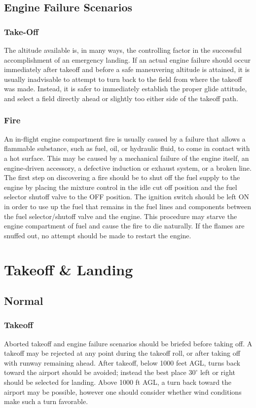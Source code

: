 \documentclass[12pt]{article}
\begin{document}
	\subsection{Engine Failure Scenarios}
		\subsubsection{Take-Off}
			The altitude available is, in many ways, the controlling factor in the successful accomplishment of an emergency landing. If an actual engine failure should occur immediately after takeoff and before a safe maneuvering altitude is attained, it is usually inadvisable to attempt to turn back to the field from where the takeoff was made. Instead, it is safer to immediately establish the proper glide attitude, and select a field directly ahead or slightly too either side of the takeoff path.
		\subsubsection{Fire}
			An in-flight engine compartment fire is usually caused by a failure that allows a flammable substance, such as fuel, oil, or hydraulic fluid, to come in contact with a hot surface. This may be caused by a mechanical failure of the engine itself, an engine-driven accessory, a defective induction or exhaust system, or a broken line. The first step on discovering a fire should be to shut off the fuel supply to the engine by placing the mixture control in the idle cut off position and the fuel selector shutoff valve to the OFF position. The ignition switch should be left ON in order to use up the fuel that remains in the fuel lines and components between the fuel selector/shutoff valve and the engine. This procedure may starve the engine compartment of fuel and cause the fire to die naturally. If the flames are snuffed out, no attempt should be made to restart the engine.
\newpage
\section{Takeoff \& Landing}
	\subsection{Normal}
		\subsubsection{Takeoff}
			Aborted takeoff and engine failure scenarios should be briefed before taking off. A takeoff may be rejected at any point during the takeoff roll, or after taking off with runway remaining ahead. After takeoff, below 1000 feet AGL, turns back toward the airport should be avoided; instead the best place $30^\circ$ left or right should be selected for landing. Above 1000 ft AGL, a turn back toward the airport may be possible, however one should consider whether wind conditions make such a turn favorable.\\
\end{document}
